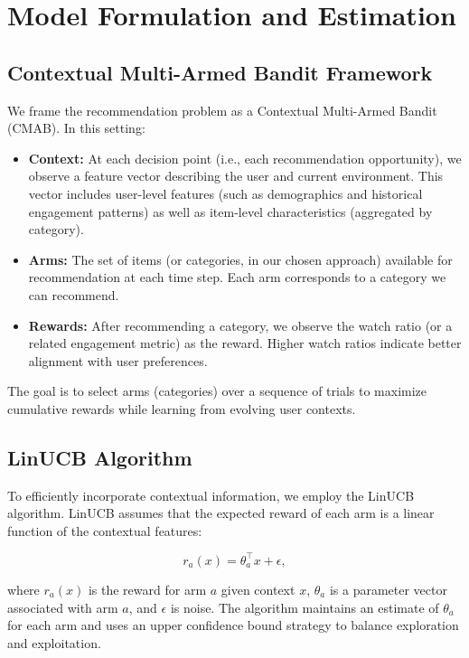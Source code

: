 \section{Model Formulation and Estimation}

\subsection{Contextual Multi-Armed Bandit Framework}

We frame the recommendation problem as a Contextual Multi-Armed Bandit (CMAB). In this setting:

\begin{itemize}
    \item \textbf{Context:} At each decision point (i.e., each recommendation opportunity), we observe a feature vector describing the user and current environment. This vector includes user-level features (such as demographics and historical engagement patterns) as well as item-level characteristics (aggregated by category).
    \item \textbf{Arms:} The set of items (or categories, in our chosen approach) available for recommendation at each time step. Each arm corresponds to a category we can recommend.
    \item \textbf{Rewards:} After recommending a category, we observe the watch ratio (or a related engagement metric) as the reward. Higher watch ratios indicate better alignment with user preferences.
\end{itemize}

The goal is to select arms (categories) over a sequence of trials to maximize cumulative rewards while learning from evolving user contexts.

\subsection{LinUCB Algorithm}

To efficiently incorporate contextual information, we employ the LinUCB algorithm. LinUCB assumes that the expected reward of each arm is a linear function of the contextual features:

\[
r_{a}(x) = \theta_a^\top x + \epsilon,
\]

where \(r_{a}(x)\) is the reward for arm \(a\) given context \(x\), \(\theta_a\) is a parameter vector associated with arm \(a\), and \(\epsilon\) is noise. The algorithm maintains an estimate of \(\theta_a\) for each arm and uses an upper confidence bound strategy to balance exploration and exploitation.

